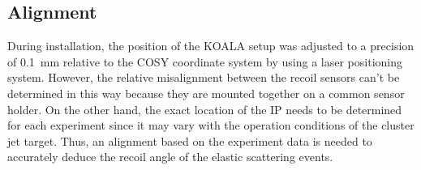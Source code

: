 \documentclass[number,5p]{elsarticle}
\begin{document}
\subsection{Alignment}
\label{sec:alignment}

During installation, the position of the KOALA setup was adjusted to a precision
of \SI{0.1}{\mm} relative to the COSY coordinate system by using a laser positioning system.
However, the relative misalignment between the recoil sensors can't be
determined in this way because they are mounted together on a common sensor holder.
On the other hand, the exact location of the IP needs to be determined for each experiment since
it may vary with the operation conditions of the cluster jet target.
Thus, an alignment based on the experiment data is needed to accurately deduce the recoil angle of the elastic scattering events.
\end{document}
